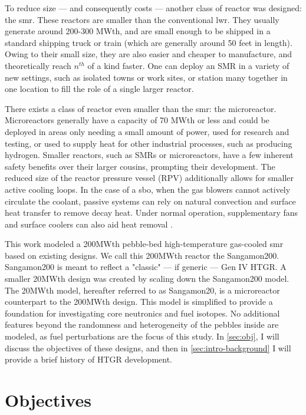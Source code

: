 To reduce size --- and consequently costs --- another class of reactor was designed: the \acrfull{smr}.  These reactors are smaller than the conventional \acrshort{lwr}.  They usually generate around 200-300 MWth, and are small enough to be shipped in a standard shipping truck or train (which are generally around 50 feet in length).  Owing to their small size, they are also easier and cheaper to manufacture, and theoretically reach $n^{th}$ of a kind faster.  One can deploy an SMR in a variety of new settings, such as isolated towns or work sites, or station many together in one location to fill the role of a single larger reactor.  

There exists a class of reactor even smaller than the \acrshort{smr}: the microreactor.  Microreactors generally have a capacity of 70 MWth or less and could be deployed in areas only needing a small amount of power, used for research and testing, or used to supply heat for other industrial processes, such as producing hydrogen.  Smaller reactors, such as SMRs or microreactors, have a few inherent safety benefits over their larger cousins, prompting their development.  The reduced size of the reactor pressure vessel (RPV) additionally allows for smaller active cooling loops.  In the case of a \acrfull{sbo}, when the gas blowers cannot actively circulate the coolant, passive systems can rely on natural convection and surface heat transfer to remove decay heat.  Under normal operation, supplementary fans and surface coolers can also aid heat removal \cite{reutler_advantages_1984}.


This work modeled a 200MWth pebble-bed high-temperature gas-cooled \acrshort{smr} based on existing designs.  We call this 200MWth reactor the Sangamon200.  Sangamon200 is meant to reflect a "classic" --- if generic --- Gen IV HTGR.  A smaller 20MWth design was created by scaling down the Sangamon200 model.  The 20MWth model, hereafter referred to as Sangamon20, is a microreactor counterpart to the 200MWth design.  This model is simplified to provide a foundation for investigating core neutronics and fuel isotopes. No additional features beyond the randomness and heterogeneity of the pebbles inside are modeled, as fuel perturbations are the focus of this study.  In \autoref{sec:obj}, I will discuss the objectives of these designs, and then in \autoref{sec:intro-background} I will provide a brief history of HTGR development.


\section{Objectives}
\label{sec:obj}

